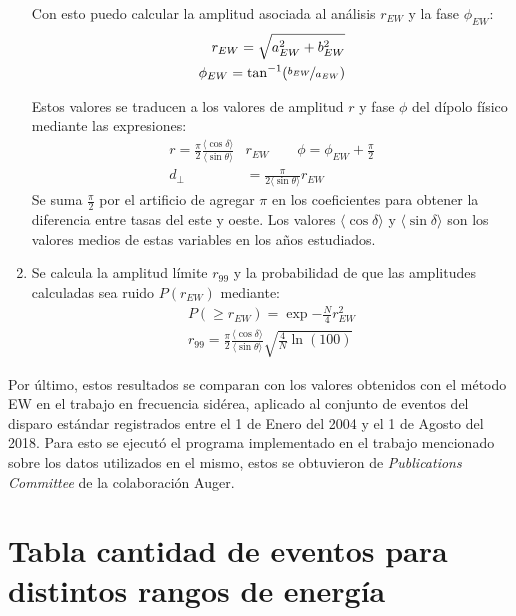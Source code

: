 \begin{enumerate}
    Con esto puedo calcular la amplitud asociada al análisis $r_{EW}$ y la fase $\phi_{EW}$:
    \begin{align*}
        r_{EW} = \sqrt{a_{EW}^2 + b_{EW}^2}\\
        \phi_{EW} = \tan^{-1}(\nicefrac{b_{EW}}{a_{EW}})
    \end{align*}

    Estos valores se traducen a los valores de amplitud $r$ y fase $\phi$ del dípolo físico mediante las expresiones:
    \begin{align*}
        r = \frac{\pi}{2} \frac{\langle\cos\delta \rangle}{\langle\sin\theta \rangle} &r_{EW} \qquad
        \phi = \phi_{EW} + \frac{\pi}{2}\\
        d_\perp&= \frac{\pi}{2 \langle\sin\theta \rangle} r_{EW}
    \end{align*}
    Se suma $\frac{\pi}{2}$ por el  artificio de agregar $\pi$ en los coeficientes para obtener la diferencia entre tasas del este y oeste. Los valores $\langle\cos\delta \rangle$ y $\langle\sin\delta \rangle$ son los valores medios de estas variables en los años estudiados. 

    \item Se calcula la amplitud límite $r_{99}$ y la probabilidad de que las amplitudes calculadas sea ruido  $P(r_{EW})$ mediante:
    \begin{align*}
        P(\geq r_{EW}) = \exp{-\frac{N}{4}r^2_{EW}}\\
        r_{99} = \frac{\pi}{2} \frac{\langle\cos\delta \rangle}{\langle\sin\theta \rangle}\sqrt{\frac{4}{N}\ln(100)}
    \end{align*}

\end{enumerate}

Por último, estos resultados se comparan con los valores obtenidos con el método EW en el trabajo \cite{Aab_2020} en frecuencia sidérea, aplicado al conjunto de eventos del disparo estándar registrados entre el 1 de Enero del 2004 y el 1 de Agosto del 2018. Para esto se ejecutó el programa implementado en el trabajo mencionado sobre los datos utilizados en el mismo, estos se obtuvieron de \emph{Publications Committee} de la colaboración Auger.

\section*{Tabla cantidad de eventos para distintos rangos de energía}

